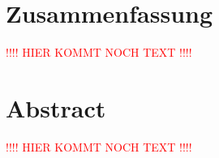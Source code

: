 \section*{Zusammenfassung}
\label{sec:Zusammenfassung}


\textcolor{red}{!!!! HIER KOMMT NOCH TEXT !!!!}



\section*{Abstract}
\label{sec:Abstract}

\textcolor{red}{!!!! HIER KOMMT NOCH TEXT !!!!}



